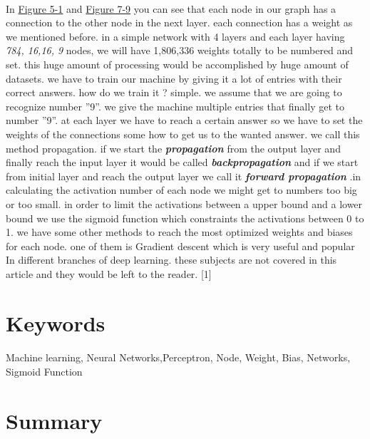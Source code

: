 \documentclass[12pt , a4paper]{article}
\begin{document}
\paragraph{} In  \hyperref [f-5-1]{Figure 5-1}  and \hyperref [f-6-9]{Figure 7-9} you can see that each node in our graph has a connection to the other node in the next layer. each connection has a weight as we mentioned before. in a simple network with 4 layers and each layer having\textit{ 784, 16,16, 9 }nodes, we will have 1,806,336 weights totally to be numbered and set. this huge amount of processing would be accomplished by huge amount of datasets. we have to train our machine by giving it a lot of entries with their correct answers. how do we train it ? simple. we assume that we are going to recognize number ''9''. we give the machine multiple entries that finally get to number ''9''. at each layer we have to reach a certain answer so we have to set the weights of the connections some how to get us to the wanted answer. we call this method propagation. if we start the \textbf{\textit{propagation} } from the output layer and finally reach the input layer it would be called \textbf{\textit{backpropagation} }  and if we start from initial layer and reach the output layer we call it \textbf{\textit{forward propagation} }.in calculating the activation number of each node we might get to numbers too big or too small. in order to limit the activations between a upper bound and a lower bound we use the sigmoid function which constraints the activations between 0 to 1. we have some other methods to reach the most optimized weights and biases for each node. one of them is Gradient descent which is very useful and popular In different branches of deep learning. these subjects are not covered in this article and they would be left to the reader. [1]

\section { Keywords } 
\paragraph{} Machine learning, Neural Networks,Perceptron, Node, Weight, Bias, Networks,   Sigmoid Function 


\section{Summary}
\end{document}
